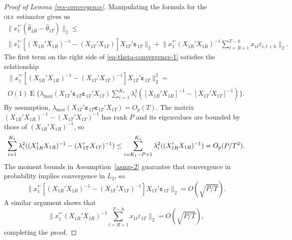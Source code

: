 \documentclass[11pt]{article}
\DeclareMathOperator{\E}{E}
\newcommand{\oosSum}[2]{\ensuremath{\sum_{#1=R+#2}^{T-\h}}}
\newcommand{\h}{h}
\newcommand{\bh}[1]{\ensuremath{\hat\theta_{#1}}}
\newcommand{\ep}[1]{\ensuremath{\boldsymbol{\varepsilon}_{#1}}}
\newcommand{\ols}{\textsc{ols}}
\begin{document}
\begin{proof}[Proof of Lemma \ref{res-convergence}]
Manipulating the formula for the \ols\ estimator gives us
\begin{multline} \label{eq-theta-convergence-1}
\lVert x_1^{*\prime} (\bh{1R} - \bh{1T}) \rVert_2  \leq\\
\lVert x_1^{*\prime} [(X_{1R}'X_{1R})^{-1} - (X_{1T}'X_{1T})]
X_{1T}'\ep{1T} \rVert_2  +
\lVert x_1^{*\prime} (X_{1R}'X_{1R})^{-1}\oosSum{t}{1} x_{1t}\varepsilon_{i,t+\h}
\rVert_2.
\end{multline}
The first term on the right side of \eqref{eq-theta-convergence-1}
satisfies the relationship
\begin{multline*}
  \lVert x_{1}^{*\prime}[(X_{1R}'X_{1R})^{-1} - (X_{1T}'X_{1T})^{-1} ]
  X_{1T}'\ep{1T} \rVert_2^2 = \\ O(1) \E\{\lambda_{\max}(X_{1T}'
  \ep{1T} \ep{1T}' X_{1T}) \sum_{i=1}^{K_1}
  \lambda_i^2([X_{1R}'X_{1R}]^{-1} - [X_{1T}'X_{1T}]^{-1} )\}.
\end{multline*}
By assumption, $\lambda_{\max}(X_{1T}'\ep{1T} \ep{1T}' X_{1T}) =
O_p(T)$.  The matrix $(X_{1R}'X_{1R})^{-1} - (X_{1T}'X_{1T})^{-1}$ has
rank $P$ and its eigenvalues are bounded by those of
$(X_{1R}'X_{1R})^{-1}$, so
  \[\sum_{i=1}^{K_1}\lambda_i^2((X_{1R}'X_{1R})^{-1} -
  (X_{1T}'X_{1T})^{-1} ) \leq
  \sum_{i=K_1 - P + 1}^{K_1}\lambda_i^2((X_{1R}'X_{1R})^{-1})  \\ = O_p(P/T^2).
  \]
The moment bounds in Assumption~\ref{asmp-2} guarantee that
convergence in probability implies convergence in $L_2$, so
  \[
    \lVert x_1^{*\prime} [(X_{1R}'X_{1R})^{-1} -
        (X_{1T}'X_{1T})^{-1} ]
      X_{1T}'\ep{1T} \rVert_2 = O(\sqrt{P/T}).
  \]
  A similar argument shows that
  \[
    \lVert x_1^{*\prime} (X_{1R}'X_{1R})^{-1}\oosSum{t}{1} x_{1t}\varepsilon_{1T}
    \rVert_2 =   O(\sqrt{P/T}),
  \]
  completing the proof.
\end{proof}
\end{document}
